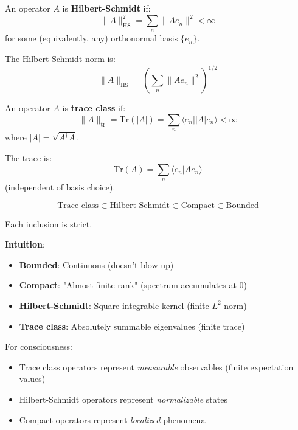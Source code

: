 \begin{definition}\label{def:hilbert-schmidt}
An operator $A$ is \textbf{Hilbert-Schmidt} if:
\begin{equation}
\| A \|_{\text{HS}}^2 = \sum_n \| A e_n \|^2 < \infty
\end{equation}
for some (equivalently, any) orthonormal basis $\{e_n\}$.

The Hilbert-Schmidt norm is:
\begin{equation}
\| A \|_{\text{HS}} = \left( \sum_n \| A e_n \|^2 \right)^{1/2}
\end{equation}
\end{definition}

\begin{definition}\label{def:trace-class}
An operator $A$ is \textbf{trace class} if:
\begin{equation}
\| A \|_{\text{tr}} = \text{Tr}(|A|) = \sum_n \langle e_n | |A| e_n \rangle < \infty
\end{equation}
where $|A| = \sqrt{A^\dagger A}$.

The trace is:
\begin{equation}
\text{Tr}(A) = \sum_n \langle e_n | A e_n \rangle
\end{equation}
(independent of basis choice).
\end{definition}

\begin{theorem}\label{thm:operator-hierarchy}
\begin{equation}
\text{Trace class} \subset \text{Hilbert-Schmidt} \subset \text{Compact} \subset \text{Bounded}
\end{equation}

Each inclusion is strict.
\end{theorem}

\begin{level2}
\textbf{Intuition}:
\begin{itemize}
\item \textbf{Bounded}: Continuous (doesn't blow up)
\item \textbf{Compact}: "Almost finite-rank" (spectrum accumulates at 0)
\item \textbf{Hilbert-Schmidt}: Square-integrable kernel (finite $L^2$ norm)
\item \textbf{Trace class}: Absolutely summable eigenvalues (finite trace)
\end{itemize}

For consciousness:
\begin{itemize}
\item Trace class operators represent \textit{measurable} observables (finite expectation values)
\item Hilbert-Schmidt operators represent \textit{normalizable} states
\item Compact operators represent \textit{localized} phenomena
\end{itemize}
\end{level2}

